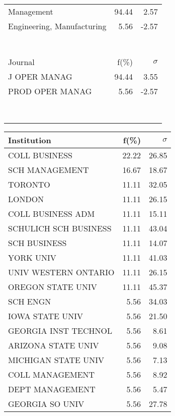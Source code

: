 \documentclass[a4paper,11pt]{report}
\begin{document}
\begin{landscape}
\begin{table}[!ht]
{\begin{tabular}{|l r  r|}
Management & 94.44 & 2.57\\
Engineering, Manufacturing & 5.56 & -2.57\\
 &  & \\
 &  & \\
 &  & \\
 &  & \\
 &  & \\
 &  & \\
 &  & \\
\hline
\hline
Journal & f(\%) & $\sigma$\\
\hline
J OPER MANAG & 94.44 & 3.55\\
PROD OPER MANAG & 5.56 & -2.57\\
 &  & \\
 &  & \\
 &  & \\
 &  & \\
 &  & \\
 &  & \\
 &  & \\
 &  & \\
\hline
\end{tabular}
}
{\scriptsize\begin{tabular}{|l r r|}
\hline
Institution & f(\%) & $\sigma$\\
\hline
COLL BUSINESS & 22.22 & 26.85\\
SCH MANAGEMENT & 16.67 & 18.67\\
TORONTO & 11.11 & 32.05\\
LONDON & 11.11 & 26.15\\
COLL BUSINESS ADM & 11.11 & 15.11\\
SCHULICH SCH BUSINESS & 11.11 & 43.04\\
SCH BUSINESS & 11.11 & 14.07\\
YORK UNIV & 11.11 & 41.03\\
UNIV WESTERN ONTARIO & 11.11 & 26.15\\
OREGON STATE UNIV & 11.11 & 45.37\\
SCH ENGN & 5.56 & 34.03\\
IOWA STATE UNIV & 5.56 & 21.50\\
GEORGIA INST TECHNOL & 5.56 & 8.61\\
ARIZONA STATE UNIV & 5.56 & 9.08\\
MICHIGAN STATE UNIV & 5.56 & 7.13\\
COLL MANAGEMENT & 5.56 & 8.92\\
DEPT MANAGEMENT & 5.56 & 5.47\\
GEORGIA SO UNIV & 5.56 & 27.78\\

\end{tabular}}
\end{table}
\end{landscape}
\end{document}
